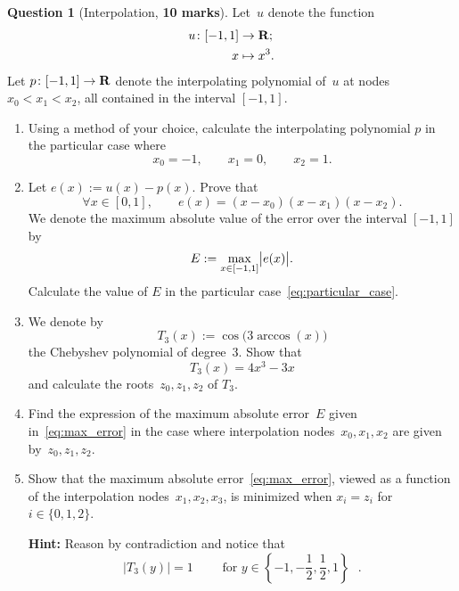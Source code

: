 \documentclass[11pt]{article}
\theoremstyle{definition}
\newtheorem{question}{Question}
\theoremstyle{remark}
\theoremstyle{plain}%
\begin{document}
\newpage
\begin{question}
    [Interpolation, \textbf{10 marks}]
    Let~$u$ denote the function
    \begin{align*}
        u\colon
        [-1, 1] &\to \mathbf R; \\
        x &\mapsto x^3.
    \end{align*}
    Let $p \colon [-1, 1] \to \mathbf R$ denote the interpolating polynomial of~$u$ at nodes $x_0 < x_1 < x_2$,
    all contained in the interval $[-1, 1]$.
    \begin{enumerate}
        \itemsep0pt
        \item
            Using a method of your choice,
            calculate the interpolating polynomial $p$ in the particular case where
            \begin{equation}
                \label{eq:particular_case}
                x_0 = -1, \qquad x_1 = 0, \qquad x_2 = 1.
            \end{equation}

        \item
            Let $e(x) := u(x) - p(x)$.
            Prove that
            \[
                \forall x \in [0, 1], \qquad
                e(x) = (x-x_0) (x-x_1) (x-x_2).
            \]
            We denote the maximum absolute value of the error over the interval $[-1, 1]$ by
            \begin{equation}
                \label{eq:max_error}
                E := \max_{x \in [-1, 1]} \abs[\big]{e(x)}.
            \end{equation}
            Calculate the value of $E$ in the particular case~\eqref{eq:particular_case}.

        \item
            We denote by
            \[
                T_3(x) := \cos\bigl(3 \arccos(x)\bigr)
            \]
            the Chebyshev polynomial of degree~3.
            Show that
            \[
                T_3(x) = 4x^3 - 3x
            \]
            and calculate the roots~$z_0, z_1, z_2$ of $T_3$.

        \item
            Find the expression of the maximum absolute error~$E$ given in~\eqref{eq:max_error}
            in the case where interpolation nodes~$x_0, x_1, x_2$ are given by~$z_0, z_1, z_2$.

        \item
            Show that the maximum absolute error~\eqref{eq:max_error},
            viewed as a function of the interpolation nodes~$x_1, x_2, x_3$,
            is minimized when $x_i = z_i$ for $i \in \{0, 1, 2\}$.

            \textbf{Hint:} Reason by contradiction and notice that
            \[
                \bigl\lvert T_3(y) \bigr\rvert = 1
                \qquad \text{ for $y \in \left\{-1, -\frac{1}{2}, \frac{1}{2}, 1 \right\}$  }.
            \]
    \end{enumerate}
\end{question}
\end{document}
